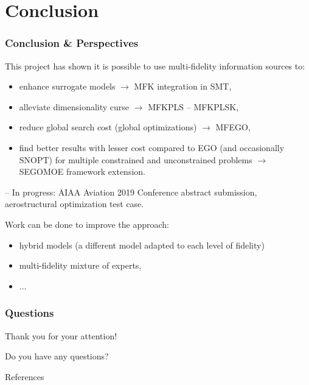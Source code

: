 \documentclass{beamer}
\theoremstyle{remark}
\theoremstyle{plain}
\begin{document}
\section{Conclusion}
\begin{frame}
  \frametitle{Conclusion \& Perspectives}
  This project has shown it is possible to use multi-fidelity information sources to:
  \small
  \begin{itemize}
  \item enhance surrogate models $\rightarrow$ \textcolor{green!10!orange!90!}{MFK integration in SMT},
  \item alleviate dimensionality curse $\rightarrow$ \textcolor{green!10!orange!90!}{MFKPLS -- MFKPLSK},
  \item reduce global search cost (global optimizations) $\rightarrow$ \textcolor{green!10!orange!90!}{MFEGO},
  \item find better results with lesser cost compared to EGO (and occasionally SNOPT) for multiple constrained and unconstrained problems $\rightarrow$ \textcolor{green!10!orange!90!}{SEGOMOE framework extension}.
  \end{itemize}
  -- In progress: \textcolor{green!10!orange!90!}{AIAA Aviation 2019 Conference abstract submission}, \textcolor{green!10!orange!90!}{aerostructural optimization test case.}
  
  \vspace{0.3cm}
  \normalsize
  Work can be done to improve the approach:
  \scriptsize
  \begin{itemize}
  \item hybrid models (a different model adapted to each level of fidelity)
  \item multi-fidelity mixture of experts,
  \item ...
  \end{itemize}
\end{frame}

\begin{frame}
  \frametitle{Questions}
  \begin{center}
    Thank you for your attention!

    Do you have any questions?
  \end{center}
\end{frame}

\setcounter{lastframe}{\insertframenumber}

\begin{frame}[allowframebreaks]{References}


 \end{frame}
\setcounter{framenumber}{\thelastframe}
\end{document}
